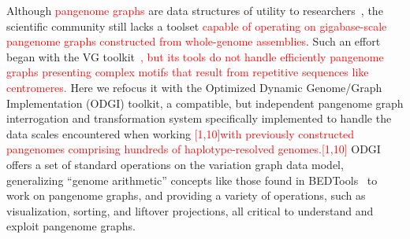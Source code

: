 \documentclass{bioinfo}
\newcommand{\REVIEWED}[1]{{\textcolor{Red}{#1}}}
\begin{document}
Although \REVIEWED{pangenome graphs} are data structures of utility to researchers~\citep{cpang2018,Garrison:2018,Baaijens_2019,Hickey:2020,Sibbesen_2021}, the scientific community still lacks a toolset \REVIEWED{capable of operating on gigabase-scale pangenome graphs constructed from whole-genome assemblies}.
Such an effort began with the VG toolkit~\citep{Garrison:2018}\REVIEWED{, but its tools do not handle efficiently pangenome graphs presenting complex motifs that result from repetitive sequences like centromeres.}
Here we refocus it with the Optimized Dynamic Genome/Graph Implementation (ODGI) toolkit, a compatible, but independent pangenome graph interrogation and transformation system specifically implemented to handle the data scales encountered when working \REVIEWED{[1,10]with previously constructed pangenomes comprising hundreds of haplotype-resolved genomes.[1,10]}
ODGI offers a set of standard operations on the variation graph data model, generalizing ``genome arithmetic'' concepts like those found in BEDTools~\citep{Quinlan_2010} to work on pangenome graphs,
and providing a variety of operations, such as visualization, sorting, and liftover projections, all critical to understand and exploit pangenome graphs.


\end{document}
